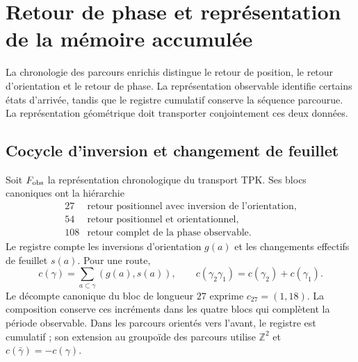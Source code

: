
\section{Retour de phase et représentation de la mémoire accumulée}
\label{vii:sec:retorno-memoria-gravedad}

La chronologie des parcours enrichis distingue le retour de position, le retour d'orientation et le retour de phase. La représentation observable identifie certains états d'arrivée, tandis que le registre cumulatif conserve la séquence parcourue. La représentation géométrique doit transporter conjointement ces deux données.

\subsection{Cocycle d'inversion et changement de feuillet}
\label{vii:subsec:cociclo-memoria}

Soit \(F_{\rm obs}\) la représentation chronologique du transport TPK.
Ses blocs canoniques ont la hiérarchie
\[
\begin{array}{c|l}
27&\text{retour positionnel avec inversion de l’orientation},\\
54&\text{retour positionnel et orientationnel},\\
108&\text{retour complet de la phase observable}.
\end{array}
\]
Le registre compte les inversions d'orientation \(g(a)\) et les
changements effectifs de feuillet \(s(a)\). Pour une route,
\begin{equation}
 c(\gamma)=\sum_{a\subset\gamma}(g(a),s(a)),\qquad
 c(\gamma_2\gamma_1)=c(\gamma_2)+c(\gamma_1).
 \label{vii:eq:cociclo-ruta}
\end{equation}
Le décompte canonique du bloc de longueur \(27\) exprime \(c_{27}=(1,18)\). La composition conserve ces incréments dans les quatre blocs qui complètent la période observable. Dans les parcours orientés vers l'avant, le registre est cumulatif ; son extension au groupoïde des parcours utilise \(\mathbb Z^2\) et \(c(\bar\gamma)=-c(\gamma)\).

